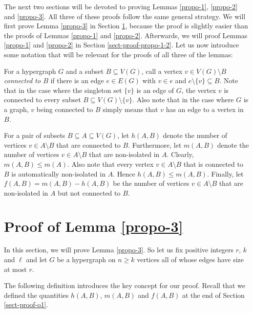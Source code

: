 \documentclass[11pt]{article}
\theoremstyle{definition}
\numberwithin{equation}{section}
\begin{document}
The next two sections will be devoted to proving Lemmas \ref{propo-1}, \ref{propo-2} and \ref{propo-3}. All three of these proofs follow the same general strategy. We will first prove Lemma \ref{propo-3} in Section \ref{sect-proof-propo-3}, because the proof is slightly easier than the proofs of Lemmas \ref{propo-1} and \ref{propo-2}. Afterwards, we will proof Lemmas \ref{propo-1} and \ref{propo-2} in Section \ref{sect-proof-propo-1-2}. Let us now introduce some notation that will be relevant for the proofs of all three of the lemmas: 

For a hypergraph $G$ and a subset $B\subseteq V(G)$, call a vertex $v\in V(G)\setminus B$ \emph{connected to $B$} if there is an edge $e\in E(G)$ with $v\in e$ and $e\setminus \lbrace v\rbrace\subseteq B$. Note that in the case where the singleton set $\lbrace v\rbrace$ is an edge of $G$, the vertex $v$ is connected to every subset $B\subseteq V(G)\setminus \lbrace v\rbrace$. Also note that in the case where $G$ is a graph, $v$ being connected to $B$ simply means that $v$ has an edge to a vertex in $B$.

For a pair of subsets $B\subseteq A\subseteq V(G)$, let $h(A,B)$ denote the number of vertices $v\in A\setminus B$ that are connected to $B$. Furthermore, let $m(A,B)$ denote the number of vertices $v\in A\setminus B$ that are non-isolated in $A$. Clearly, $m(A,B)\leq m(A)$. Also note that every vertex $v\in A\setminus B$ that is connected to $B$ is automatically non-isolated in $A$. Hence $h(A,B)\leq m(A,B)$. Finally, let $f(A,B)=m(A,B)-h(A,B)$ be the number of vertices $v\in A\setminus B$ that are non-isolated in $A$ but not connected to $B$.

\section{Proof of Lemma \ref{propo-3}}\label{sect-proof-propo-3}

In this section, we will prove Lemma \ref{propo-3}. So let us fix positive integers $r$, $k$ and $\ell$ and let $G$ be a hypergraph on $n \geq k$ vertices all of whose edges have size at most $r$.

The following definition introduces the key concept for our proof. Recall that we defined the quantities $h(A,B)$, $m(A,B)$ and $f(A,B)$ at the end of Section \ref{sect-proof-o1}.
\end{document}
